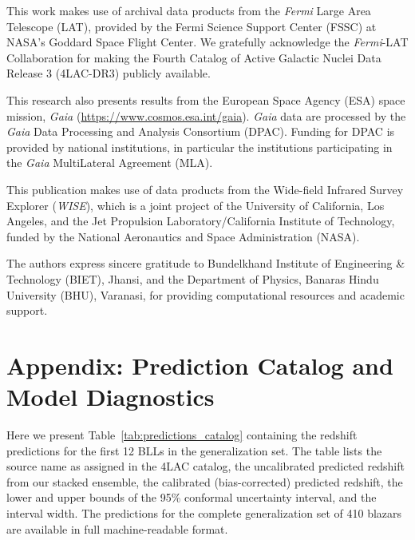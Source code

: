 \documentclass[twocolumn,linenumbers,floatfix]{aastex701}
\begin{document}
\begin{acknowledgments}
This work makes use of archival data products from the \textit{Fermi} Large Area Telescope (LAT), provided by the Fermi Science Support Center (FSSC) at NASA's Goddard Space Flight Center. We gratefully acknowledge the \textit{Fermi}-LAT Collaboration for making the Fourth Catalog of Active Galactic Nuclei Data Release 3 (4LAC-DR3) publicly available.

This research also presents results from the European Space Agency (ESA) space mission, \textit{Gaia} (\url{https://www.cosmos.esa.int/gaia}). \textit{Gaia} data are processed by the \textit{Gaia} Data Processing and Analysis Consortium (DPAC). Funding for DPAC is provided by national institutions, in particular the institutions participating in the \textit{Gaia} MultiLateral Agreement (MLA).

This publication makes use of data products from the Wide-field Infrared Survey Explorer (\textit{WISE}), which is a joint project of the University of California, Los Angeles, and the Jet Propulsion Laboratory/California Institute of Technology, funded by the National Aeronautics and Space Administration (NASA).

The authors express sincere gratitude to Bundelkhand Institute of Engineering \& Technology (BIET), Jhansi, and the Department of Physics, Banaras Hindu University (BHU), Varanasi, for providing computational resources and academic support.
\end{acknowledgments}

\appendix
\section*{Appendix: Prediction Catalog and Model Diagnostics}
Here we present Table~\ref{tab:predictions_catalog} containing the redshift predictions for the first 12 BLLs in the generalization set. The table lists the source name as assigned in the 4LAC catalog, the uncalibrated predicted redshift from our stacked ensemble, the calibrated (bias-corrected) predicted redshift, the lower and upper bounds of the 95\% conformal uncertainty interval, and the interval width. The predictions for the complete generalization set of 410 blazars are available in full machine-readable format.
\end{document}
